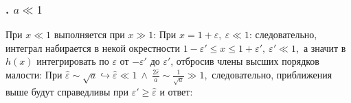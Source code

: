 \subsubsection*{. $a \ll 1$}
При $x \ll 1$ выполняется
при $x \gg 1$:
При $x = 1 + \varepsilon,\ \varepsilon \ll 1$:
следовательно, интеграл набирается в некой окрестности $1 - \varepsilon' \le x \le 1 + \varepsilon',\ \varepsilon' \ll 1$,\
а значит в $h(x)$ интегрировать по $\varepsilon$ от $-\varepsilon'$ до $\varepsilon'$, отбросив члены высших порядков малости:
При $\hat\varepsilon \sim \sqrt{a} \hookrightarrow \hat\varepsilon \ll 1\ \land\ \frac{2\hat\varepsilon}{a} \sim \frac{1}{\sqrt{a}} \gg 1$,\
следовательно, приближения выше будут справедливы при $\varepsilon' \ge \hat\varepsilon$ и
\feq{\frac{1}{a}\arctan{\frac{2\varepsilon'}{a} \approx \frac{\pi}{2a}},}
ответ:
\feq{\boxed{I(a) \approx \frac{\pi}{2a}}}